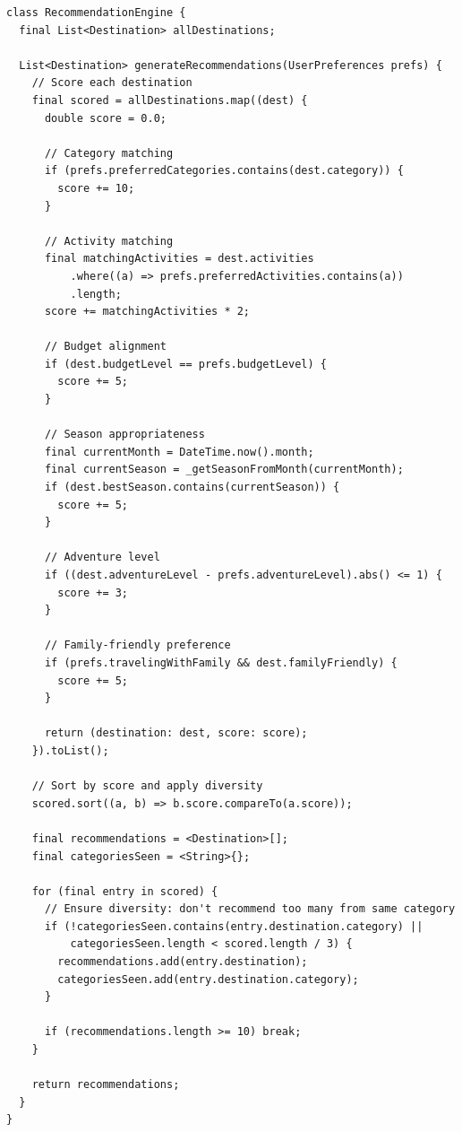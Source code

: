\documentclass[12pt,a4paper,oneside]{report}
\begin{document}
\begin{lstlisting}
class RecommendationEngine {
  final List<Destination> allDestinations;
  
  List<Destination> generateRecommendations(UserPreferences prefs) {
    // Score each destination
    final scored = allDestinations.map((dest) {
      double score = 0.0;
      
      // Category matching
      if (prefs.preferredCategories.contains(dest.category)) {
        score += 10;
      }
      
      // Activity matching
      final matchingActivities = dest.activities
          .where((a) => prefs.preferredActivities.contains(a))
          .length;
      score += matchingActivities * 2;
      
      // Budget alignment
      if (dest.budgetLevel == prefs.budgetLevel) {
        score += 5;
      }
      
      // Season appropriateness
      final currentMonth = DateTime.now().month;
      final currentSeason = _getSeasonFromMonth(currentMonth);
      if (dest.bestSeason.contains(currentSeason)) {
        score += 5;
      }
      
      // Adventure level
      if ((dest.adventureLevel - prefs.adventureLevel).abs() <= 1) {
        score += 3;
      }
      
      // Family-friendly preference
      if (prefs.travelingWithFamily && dest.familyFriendly) {
        score += 5;
      }
      
      return (destination: dest, score: score);
    }).toList();
    
    // Sort by score and apply diversity
    scored.sort((a, b) => b.score.compareTo(a.score));
    
    final recommendations = <Destination>[];
    final categoriesSeen = <String>{};
    
    for (final entry in scored) {
      // Ensure diversity: don't recommend too many from same category
      if (!categoriesSeen.contains(entry.destination.category) ||
          categoriesSeen.length < scored.length / 3) {
        recommendations.add(entry.destination);
        categoriesSeen.add(entry.destination.category);
      }
      
      if (recommendations.length >= 10) break;
    }
    
    return recommendations;
  }
}
\end{lstlisting}
\end{document}
